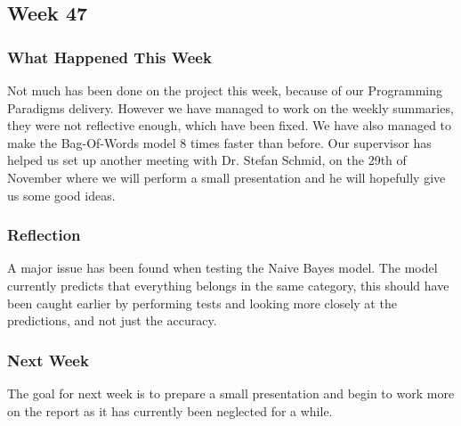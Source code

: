 \subsection{Week 47}
\subsubsection{What Happened This Week}
Not much has been done on the project this week, because of our Programming
Paradigms delivery. However we have managed to work on the weekly summaries,
they were not reflective enough, which have been fixed. We have also managed to
make the Bag-Of-Words model 8 times faster than before. Our supervisor has
helped us set up another meeting with Dr. Stefan Schmid, on the 29th of
November where we will perform a small presentation and he
will hopefully give us some good ideas. 

\subsubsection{Reflection}
A major issue has been found when testing the Naive Bayes model. The model
currently predicts that everything belongs in the same category, this should
have been caught earlier by performing tests and looking more closely at the
predictions, and not just the accuracy.

\subsubsection{Next Week}
The goal for next week is to prepare a small presentation and begin to work more on
the report as it has currently been neglected for a while. 


% 
% 
% 
